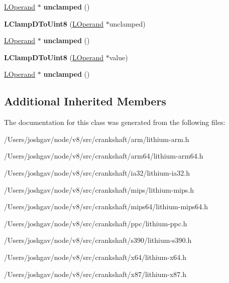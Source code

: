 \begin{DoxyCompactItemize}
\item 
\hyperlink{classv8_1_1internal_1_1_l_operand}{L\+Operand} $\ast$ {\bfseries unclamped} ()\hypertarget{classv8_1_1internal_1_1_l_clamp_d_to_uint8_ae1a158f439b6762d4b5d1555ad272ba5}{}\label{classv8_1_1internal_1_1_l_clamp_d_to_uint8_ae1a158f439b6762d4b5d1555ad272ba5}

\item 
{\bfseries L\+Clamp\+D\+To\+Uint8} (\hyperlink{classv8_1_1internal_1_1_l_operand}{L\+Operand} $\ast$unclamped)\hypertarget{classv8_1_1internal_1_1_l_clamp_d_to_uint8_ad9e1e3669905ca8387e7c292d3f2d9d5}{}\label{classv8_1_1internal_1_1_l_clamp_d_to_uint8_ad9e1e3669905ca8387e7c292d3f2d9d5}

\item 
\hyperlink{classv8_1_1internal_1_1_l_operand}{L\+Operand} $\ast$ {\bfseries unclamped} ()\hypertarget{classv8_1_1internal_1_1_l_clamp_d_to_uint8_ae1a158f439b6762d4b5d1555ad272ba5}{}\label{classv8_1_1internal_1_1_l_clamp_d_to_uint8_ae1a158f439b6762d4b5d1555ad272ba5}

\item 
{\bfseries L\+Clamp\+D\+To\+Uint8} (\hyperlink{classv8_1_1internal_1_1_l_operand}{L\+Operand} $\ast$value)\hypertarget{classv8_1_1internal_1_1_l_clamp_d_to_uint8_a0101517b76813a2b46b452bc23ced691}{}\label{classv8_1_1internal_1_1_l_clamp_d_to_uint8_a0101517b76813a2b46b452bc23ced691}

\item 
\hyperlink{classv8_1_1internal_1_1_l_operand}{L\+Operand} $\ast$ {\bfseries unclamped} ()\hypertarget{classv8_1_1internal_1_1_l_clamp_d_to_uint8_ae1a158f439b6762d4b5d1555ad272ba5}{}\label{classv8_1_1internal_1_1_l_clamp_d_to_uint8_ae1a158f439b6762d4b5d1555ad272ba5}

\end{DoxyCompactItemize}
\subsection*{Additional Inherited Members}


The documentation for this class was generated from the following files\+:\begin{DoxyCompactItemize}
\item 
/\+Users/joshgav/node/v8/src/crankshaft/arm/lithium-\/arm.\+h\item 
/\+Users/joshgav/node/v8/src/crankshaft/arm64/lithium-\/arm64.\+h\item 
/\+Users/joshgav/node/v8/src/crankshaft/ia32/lithium-\/ia32.\+h\item 
/\+Users/joshgav/node/v8/src/crankshaft/mips/lithium-\/mips.\+h\item 
/\+Users/joshgav/node/v8/src/crankshaft/mips64/lithium-\/mips64.\+h\item 
/\+Users/joshgav/node/v8/src/crankshaft/ppc/lithium-\/ppc.\+h\item 
/\+Users/joshgav/node/v8/src/crankshaft/s390/lithium-\/s390.\+h\item 
/\+Users/joshgav/node/v8/src/crankshaft/x64/lithium-\/x64.\+h\item 
/\+Users/joshgav/node/v8/src/crankshaft/x87/lithium-\/x87.\+h\end{DoxyCompactItemize}
